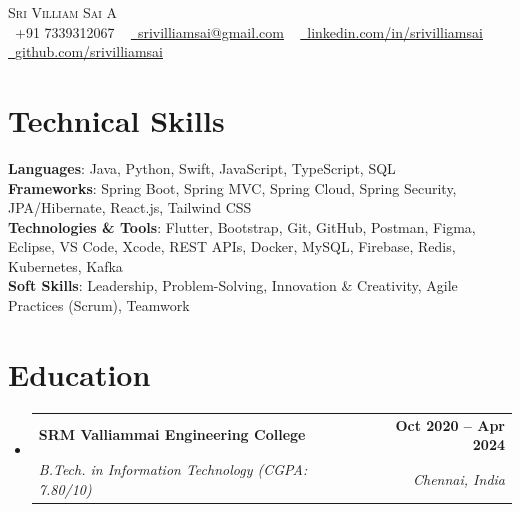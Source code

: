 \documentclass[letterpaper,11pt]{article}
\makeatletter
\newcommand{\resumeSubheading}[4]{
  \vspace{-2pt}\item
    \begin{tabular*}{1.0\textwidth}[t]{l@{\extracolsep{\fill}}r}
      \textbf{#1} & \textbf{\small #2} \\
      \textit{\small#3} & \textit{\small #4} \\
    \end{tabular*}\vspace{-7pt}
}
\newcommand{\resumeSubHeadingListStart}{\begin{itemize}[leftmargin=0.0in, label={}]}
\newcommand{\resumeSubHeadingListEnd}{\end{itemize}}
\makeatother
\begin{document}
\begin{center}
    {\Huge \scshape Sri Villiam Sai A} \\ \vspace{8pt}
    \small \raisebox{-0.1\height}\faPhone\ +91 7339312067 ~ \href{mailto:srivilliamsai@gmail.com}{\raisebox{-0.2\height}\faEnvelope\ \underline{srivilliamsai@gmail.com}} ~ 
    \href{https://linkedin.com/in/srivilliamsai}{\raisebox{-0.2\height}\faLinkedin\ \underline{linkedin.com/in/srivilliamsai}} ~
    \href{https://github.com/srivilliamsai}{\raisebox{-0.2\height}\faGithub\ \underline{github.com/srivilliamsai}}
    \vspace{0pt}
\end{center}

\section{Technical Skills}
 \begin{itemize}[leftmargin=0.15in, label={}]
    \small{\item{
     \textbf{Languages}{: Java, Python, Swift, JavaScript, TypeScript, SQL} \\ \vspace{3pt}
     \textbf{Frameworks}{: Spring Boot, Spring MVC, Spring Cloud, Spring Security, JPA/Hibernate, React.js, Tailwind CSS} \\ \vspace{3pt}
     \textbf{Technologies \& Tools}{: Flutter, Bootstrap, Git, GitHub, Postman, Figma, Eclipse, VS Code, Xcode, REST APIs, Docker, MySQL, Firebase, Redis, Kubernetes, Kafka} \\ \vspace{3pt}
     \textbf{Soft Skills}{: Leadership, Problem-Solving, Innovation \& Creativity, Agile Practices (Scrum), Teamwork}
    }}
 \end{itemize}
 \vspace{-16pt}

\section{Education}
  \resumeSubHeadingListStart
    \resumeSubheading
      {SRM Valliammai Engineering College}{Oct 2020 -- Apr 2024}
      {B.Tech. in Information Technology (CGPA: 7.80/10)}{Chennai, India}
  \resumeSubHeadingListEnd
\vspace{-8pt}
\end{document}
